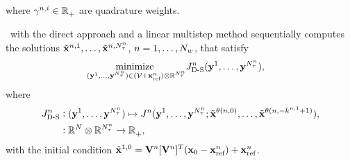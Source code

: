 where $\gamma^{n,i} \in \mathbb{R}^{}_{+}$ are quadrature weights.  

\methodAcronym\ with the direct approach and a linear multistep method sequentially computes the solutions
$\tilde{\mathbf{x}}^{n,1},\ldots,\tilde{\mathbf{x}}^{n,N_{\tau}^{n}}$,
$n=1,\ldots,N_w$, that satisfy
\begin{align*}
	&\underset{(\mathbf{y}^{1},\ldots,\mathbf{y}^{N_{\tau}^{n}}) \in ( \mathcal{V } + \mathbf{x}_\text{ref}^{n}) \otimes \mathbb{R}^{N_{\tau}^{n}}}{\text{minimize } }
J^{n}_{\text{D-S}} (\mathbf{y}^{1},\ldots,\mathbf{y}^{N_{\tau}^{n}}), 
\end{align*}
where
\begin{equation*}
\begin{split}
J^{n}_{\text{D-S}} &\vcentcolon  (\mathbf{y}^{1},\ldots,\mathbf{y}^{N_{\tau}^{n}}) \mapsto J^{n}(\mathbf{y}^{1},\ldots,\mathbf{y}^{N_{\tau}^{n}}; \tilde{\mathbf{x}}^{\theta(n,0)},\ldots,\tilde{\mathbf{x}}^{\theta(n,-k^{n,1}+1)}), \\
&\vcentcolon \mathbb{R}^{N} \otimes \mathbb{R}^{N_{\tau}^{n}} \rightarrow \mathbb{R}^{}_+,
\end{split}
\end{equation*}
with the initial condition $\tilde{\mathbf{x}}^{1,0} = \mathbf {V}^{n}[\mathbf {V}^{n}]^T ({{\mathbf{x}}_0} - \mathbf{x}_\text{ref}^{n}) + \mathbf{x}_\text{ref}^{n}$.

